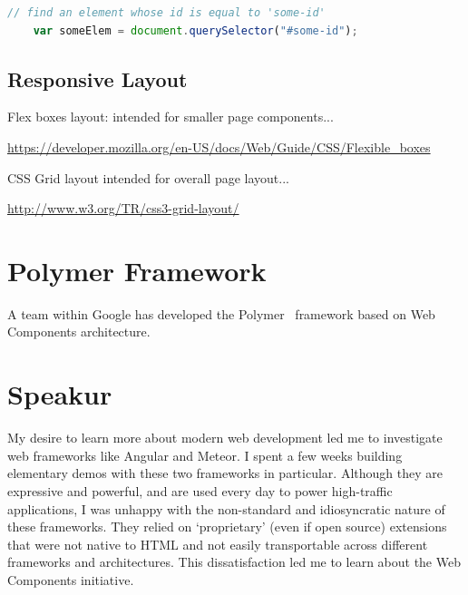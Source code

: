 \begin{lstlisting}[language=JavaScript,numbers=none]
	// find an element whose id is equal to 'some-id'
	var someElem = document.querySelector("#some-id");
\end{lstlisting}










\subsection{Responsive Layout}

Flex boxes layout: intended for smaller page components...

\url{https://developer.mozilla.org/en-US/docs/Web/Guide/CSS/Flexible_boxes}


CSS Grid layout intended for overall page layout...

\url{http://www.w3.org/TR/css3-grid-layout/}


\section{Polymer Framework}

A team within Google has developed the Polymer~\cite{polymercontributors2015} framework based on Web Components architecture.

\section{Speakur}
My desire to learn more about modern web development led me to investigate web frameworks like Angular and Meteor.
I spent a few weeks building elementary demos with these two frameworks in particular.
Although they are expressive and powerful, and are used every day to power high-traffic applications, 
I was unhappy with the non-standard and idiosyncratic nature of these frameworks. 
They relied on `proprietary' (even if open source) extensions that were not native to HTML and not easily transportable across different frameworks and architectures.
This dissatisfaction led me to learn about the Web Components initiative.


